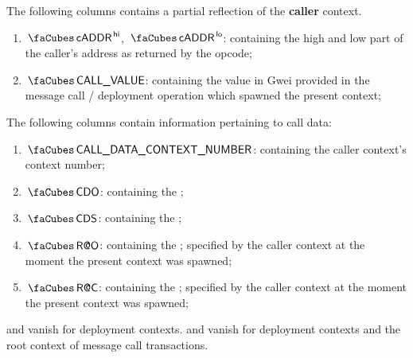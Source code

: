 The following columns contains a partial reflection of the \textbf{caller} context. 
\begin{enumerate}[resume]
	\item $\cnCallerAddress\high$, $\cnCallerAddress\low$:
		\cncc{} containing the high and low part of the caller's address as returned by the  opcode;
	\item $\cnCallValue$:
		\cncc{} containing the value in Gwei provided in the message call / deployment operation which spawned the present context; 
\end{enumerate}
The following columns contain information pertaining to call data:
\begin{enumerate}[resume]
	\item $\cnCallDataContextNumber$:
		\cncc{} containing the caller context's context number;
	\item $\cnCdo$:
		\cncc{} containing the \CDO{};
	\item $\cnCds$:
		\cncc{} containing the \CDS{};
	\item $\cnRao$:
		\cncc{} containing the \RAO{};
		specified by the caller context at the moment the present context was spawned;
	\item $\cnRac$:
		\cncc{} containing the \RAC{};
		specified by the caller context at the moment the present context was spawned;
\end{enumerate}
\saNote{} \cnCdo{} and \cnCds{} vanish for deployment contexts.
\saNote{} \cnRao{} and \cnRac{} vanish for deployment contexts and the root context of message call transactions.

